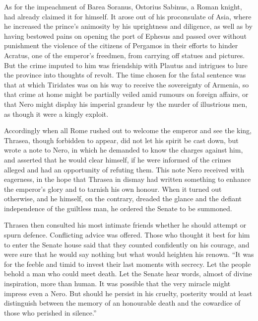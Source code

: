 As for the impeachment of Barea Soranus, Ostorius Sabinus, a Roman knight, had already claimed it for himself. It arose out of his proconsulate of Asia, where he increased the prince's animosity by his uprightness and diligence, as well as by having bestowed pains on opening the port of Ephesus and passed over without punishment the violence of the citizens of Pergamos in their efforts to hinder Acratus, one of the emperor's freedmen, from carrying off statues and pictures. But the crime imputed to him was friendship with Plautus and intrigues to lure the province into thoughts of revolt. The time chosen for the fatal sentence was that at which Tiridates was on his way to receive the sovereignty of Armenia, so that crime at home might be partially veiled amid rumours on foreign affairs, or that Nero might display his imperial grandeur by the murder of illustrious men, as though it were a kingly exploit.


Accordingly when all Rome rushed out to welcome the emperor and see the king, Thrasea, though forbidden to appear, did not let his spirit be cast down, but wrote a note to Nero, in which he demanded to know the charges against him, and asserted that he would clear himself, if he were informed of the crimes alleged and had an opportunity of refuting them. This note Nero received with eagerness, in the hope that Thrasea in dismay had written something to enhance the emperor's glory and to tarnish his own honour. When it turned out otherwise, and he himself, on the contrary, dreaded the glance and the defiant independence of the guiltless man, he ordered the Senate to be summoned.


Thrasea then consulted his most intimate friends whether he should attempt or spurn defence. Conflicting advice was offered. Those who thought it best for him to enter the Senate house said that they counted confidently on his courage, and were sure that he would say nothing but what would heighten his renown. ``It was for the feeble and timid to invest their last moments with secrecy. Let the people behold a man who could meet death. Let the Senate hear words, almost of divine inspiration, more than human. It was possible that the very miracle might impress even a Nero. But should he persist in his cruelty, posterity would at least distinguish between the memory of an honourable death and the cowardice of those who perished in silence.''


